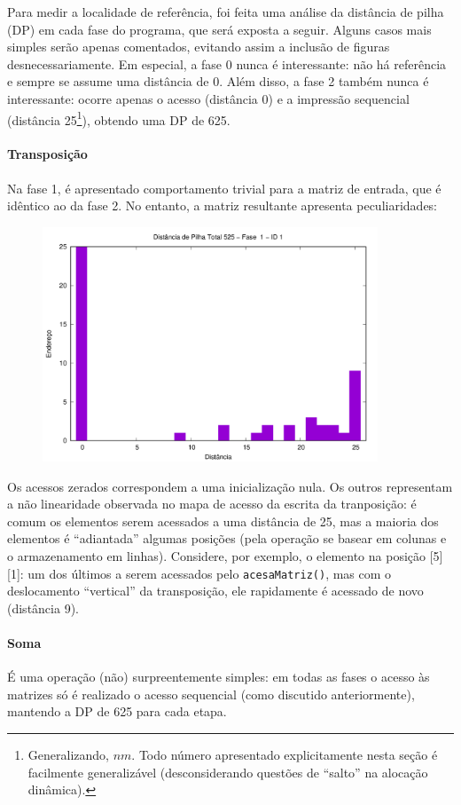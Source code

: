 \documentclass{article}
\def\code#1{\texttt{#1}}
\begin{document}
Para medir a localidade de referência, foi feita uma análise da distância de pilha (DP) em cada fase do programa, que será exposta a seguir. Alguns casos mais simples serão apenas comentados, evitando assim a inclusão de figuras desnecessariamente. Em especial, a fase 0 nunca é interessante: não há referência e sempre se assume uma distância de 0. Além disso, a fase 2 também nunca é interessante: ocorre apenas o acesso (distância 0) e a impressão sequencial (distância 25\footnote{Generalizando, \( nm \). Todo número apresentado explicitamente nesta seção é facilmente generalizável (desconsiderando questões de ``salto'' na alocação dinâmica).}), obtendo uma DP de 625.

\paragraph{Transposição} Na fase 1, é apresentado comportamento trivial para a matriz de entrada, que é idêntico ao da fase 2. No entanto, a matriz resultante apresenta peculiaridades:

\begin{figure} [H]
    \includegraphics[width=10cm]{t-hist-1-1.png} 
    \centering
\end{figure}

Os acessos zerados correspondem a uma inicialização nula. Os outros representam a não linearidade observada no mapa de acesso da escrita da tranposição: é comum os elementos serem acessados a uma distância de 25, mas a maioria dos elementos é ``adiantada'' algumas posições (pela operação se basear em colunas e o armazenamento em linhas). Considere, por exemplo, o elemento na posição [5][1]: um dos últimos a serem acessados pelo \code{acesaMatriz()}, mas com o deslocamento ``vertical'' da transposição, ele rapidamente é acessado de novo (distância 9).

\paragraph{Soma} É uma operação (não) surpreentemente simples: em todas as fases o acesso às matrizes só é realizado o acesso sequencial (como discutido anteriormente), mantendo a DP de 625 para cada etapa.
\end{document}
